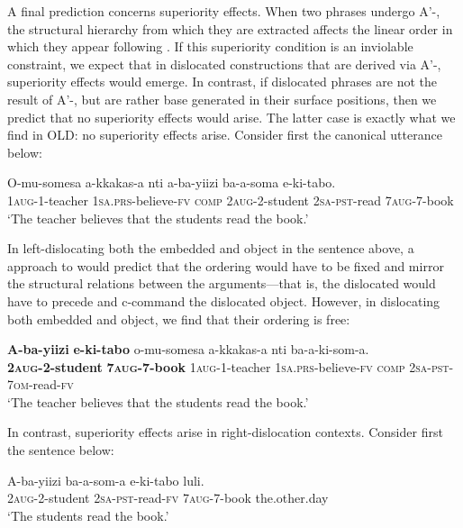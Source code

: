 \documentclass[output=paper
,newtxmath
,modfonts
,nonflat]{langsci/langscibook}
\begin{document}
\textup{A final prediction concerns superiority effects. When two phrases undergo A’-, the structural hierarchy from which they are extracted affects the linear order in which they appear following . If this superiority condition is an inviolable constraint, we expect that in dislocated constructions that are derived via A’-, superiority effects would emerge. In contrast, if dislocated phrases are not the result of A’-, but are rather base generated in their surface positions, then we predict that no superiority effects would arise. The latter case is exactly what we find in  OLD: no superiority effects arise. Consider first the canonical utterance below:}


\ea\label{ex:ranero:38}
\gll O-mu-somesa    a-kkakas-a                 nti        a-ba-yiizi           ba-a-soma     e-ki-tabo.\\
1\textsc{aug}{}-1-teacher \textsc{1sa.prs}{}-believe-\textsc{fv} \textsc{comp} \textsc{2aug-2-}student \textsc{2sa-pst}{}-read 7\textsc{aug}{}-7-book\\
\glt ‘The teacher believes that the students read the book.’
\z

In left-dislocating both the embedded  and object in the sentence above, a  approach to  would predict that the ordering would have to be fixed and mirror the structural relations between the arguments—that is, the dislocated  would have to precede and c-command the dislocated object. However, in dislocating both embedded  and object, we find that their ordering is free:

\ea\label{ex:ranero:39}
\gll \textbf{A-ba-yiizi}           \textbf{{\textbar}{\textbar}} \textbf{e-ki-tabo}        o-mu-somesa     a-kkakas-a            nti  ba-a-ki-som-a.\\
\textbf{2\textsc{aug}}\textbf{{}-2-student}  {}  \textbf{7}\textbf{\textsc{aug}}\textbf{{}-7-book} 1\textsc{aug}{}-1-teacher \textsc{1sa.prs}{}-believe-\textsc{fv} \textsc{comp} \textsc{2sa-pst-7om}{}-read\textsc{{}-fv}\\
\glt \textsc{‘}The teacher believes that the students read the book.’
\z

\textup{In contrast, superiority effects arise in right-dislocation contexts. Consider first the sentence below:}

\ea\label{ex:ranero:40}
\gll A-ba-yiizi       ba-a-som-a  e-ki-tabo   luli.\\
2\textsc{aug}{}-2-student \textsc{2sa-pst}{}-read-\textsc{fv} 7\textsc{aug}{}-7-book the.other.day\\
\glt ‘The students read the book.’
\z
\end{document}
